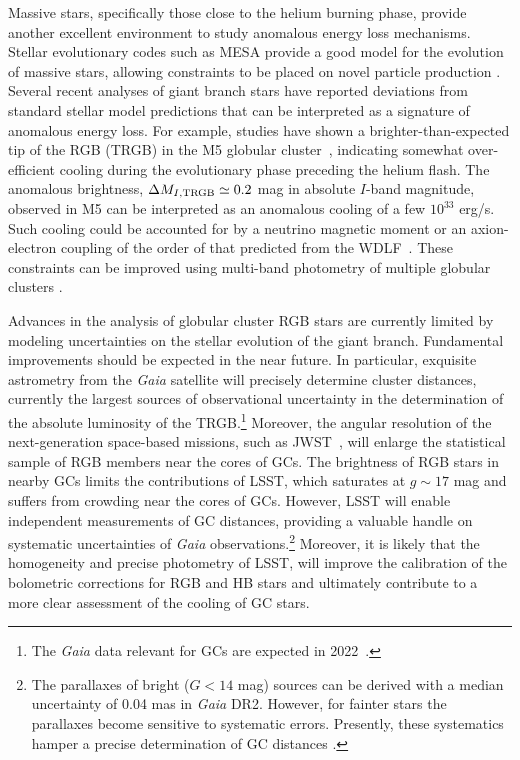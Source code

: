 Massive stars, specifically those close to the helium burning phase, provide another excellent environment to study anomalous energy loss mechanisms. 
Stellar evolutionary codes such as MESA \citep{1009.1622} provide a good model for the evolution of massive stars, allowing constraints to be placed on novel particle production \citep[\eg,][]{1210.1271,1611.05852}.
Several recent analyses of giant branch stars have reported deviations from standard stellar model predictions that can be interpreted as a signature of anomalous energy loss.
For example, studies have shown a brighter-than-expected tip of the RGB (TRGB) in the M5 globular cluster~\citep{Viaux:2013lha,Viaux:2013hca}, indicating somewhat over-efficient cooling during the evolutionary phase preceding the helium flash.
The anomalous brightness, $\Delta M_{I,{\rm TRGB}}\simeq 0.2$ mag in absolute $I$-band magnitude, observed in M5 can be interpreted as an anomalous cooling of a few $10^{33}$ erg/s.
Such cooling could be accounted for by a neutrino magnetic moment or an axion-electron coupling of the order of that predicted from the WDLF~\citep{Viaux:2013lha}. 
These constraints can be improved using multi-band photometry of multiple globular clusters \citep[\eg,][]{Straniero:2018fbv}.

Advances in the analysis of globular cluster RGB stars are currently limited by modeling uncertainties on the stellar evolution of the giant branch.
Fundamental improvements should be expected in the near future. 
In particular, exquisite astrometry from the {\it Gaia} satellite will precisely determine cluster distances, currently the largest sources of observational uncertainty in the determination of the absolute luminosity of the TRGB.\footnote{The {\it Gaia} data relevant for GCs are expected in 2022~\citep{Gaia}.}
Moreover, the angular resolution of the next-generation space-based missions, such as JWST~\citep{Gardner:2006ky}, will enlarge the statistical sample of RGB members near the cores of GCs. 
The brightness of RGB stars in nearby GCs limits the contributions of LSST, which saturates at $g \sim 17$ mag and suffers from crowding near the cores of GCs.
However, LSST will enable independent measurements of GC distances, providing a valuable handle on systematic uncertainties of {\it Gaia} observations.\footnote{The parallaxes of bright ($G<14$ mag) sources can be derived with a median uncertainty of 0.04 mas in {\it Gaia} DR2. However, for fainter stars the parallaxes become sensitive to systematic errors.  Presently, these systematics hamper a precise determination of GC distances \citep{Chen:2018}.}
Moreover, it is likely that the homogeneity and precise photometry of LSST, will improve the calibration of the bolometric corrections for RGB and HB stars and ultimately contribute to a more clear assessment of the cooling of GC stars.


